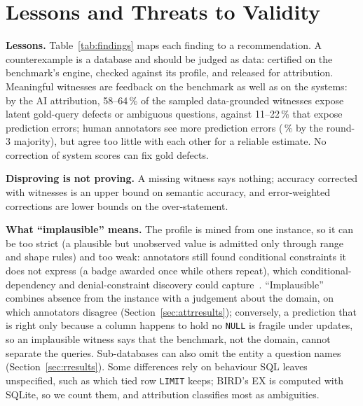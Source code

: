 \section{Lessons and Threats to Validity}\label{sec:threats}


\textbf{Lessons.} Table~\ref{tab:findings} maps each finding to a recommendation. A counterexample is a database and should be judged as data: certified on the benchmark's engine, checked against its profile, and released for attribution. Meaningful witnesses are feedback on the benchmark as well as on the systems: by the AI attribution, 58--64\,\% of the sampled data-grounded witnesses expose latent gold-query defects or ambiguous questions, against 11--22\,\% that expose prediction errors; human annotators see more prediction errors (\,\% by the round-3 majority), but agree too little with each other for a reliable estimate. No correction of system scores can fix gold defects.

\textbf{Disproving is not proving.} A missing witness says nothing; accuracy corrected with witnesses is an upper bound on semantic accuracy, and error-weighted corrections are lower bounds on the over-statement.

\textbf{What ``implausible'' means.} The profile is mined from one instance, so it can be too strict (a plausible but unobserved value is admitted only through range and shape rules) and too weak: annotators still found conditional constraints it does not express (a badge awarded once while others repeat), which conditional-dependency and denial-constraint discovery could capture~\cite{fan2011cfd,chu2013dc}. ``Implausible'' combines absence from the instance with a judgement about the domain, on which annotators disagree (Section~\ref{sec:attrresults}); conversely, a prediction that is right only because a column happens to hold no \texttt{NULL} is fragile under updates, so an implausible witness says that the benchmark, not the domain, cannot separate the queries. Sub-databases can also omit the entity a question names (Section~\ref{sec:rresults}). Some differences rely on behaviour SQL leaves unspecified, such as which tied row \texttt{LIMIT} keeps; BIRD's EX is computed with SQLite, so we count them, and attribution classifies most as ambiguities.

